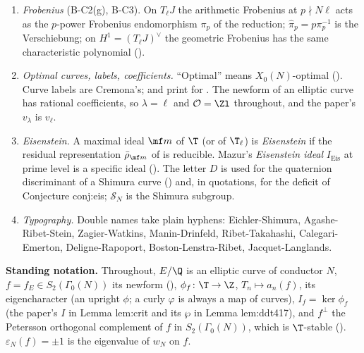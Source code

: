 \begin{convention}
\begin{enumerate}[label=(C\arabic*)]
\item \emph{Frobenius} (B-C2(g), B-C3). On $T_\ell J$ the arithmetic Frobenius at $p\nmid N\ell$ acts as the $p$-power Frobenius endomorphism
$\pi_p$ of the reduction; $\hat\pi_p=p\pi_p^{-1}$ is the Verschiebung; on $H^1=(T_\ell J)^\vee$ the geometric Frobenius has the same characteristic
polynomial ().
\item \emph{Optimal curves, labels, coefficients.} ``Optimal'' means $X_0(N)$-optimal (). Curve labels are Cremona's;
\cite{ARS12} and \cite{Cremona97} print  for . The newform of an elliptic curve has rational coefficients, so $\lambda=\ell$ and
$\mathcal O=\Zl$ throughout, and the paper's $v_\lambda$ is $v_\ell$.
\item \emph{Eisenstein.} A maximal ideal $\mf m$ of $\T$ (or of $\T_\ell$) is \emph{Eisenstein} if the residual representation $\bar\rho_{\mf m}$ of
 is reducible. Mazur's \emph{Eisenstein ideal} $I_{\mathrm{Eis}}$ at prime level is a specific ideal
(). The letter $D$ is used for the quaternion discriminant of a Shimura curve () and,
in quotations, for the deficit of Conjecture conj:eis; $\mathcal S_N$ is the Shimura subgroup.
\item \emph{Typography.} Double names take plain hyphens: Eichler-Shimura, Agashe-Ribet-Stein, Zagier-Watkins, Manin-Drinfeld,
Ribet-Takahashi, Calegari-Emerton, Deligne-Rapoport, Boston-Lenstra-Ribet, Jacquet-Langlands.
\end{enumerate}
\end{convention}

\noindent\textbf{Standing notation.} Throughout, $E/\Q$ is an elliptic curve of conductor $N$, $f=f_E\in S_2(\Gamma_0(N))$ its newform
(), $\phi_f\colon\T\to\Z$, $T_n\mapsto a_n(f)$, its eigencharacter (an upright $\phi$; a curly $\varphi$ is always a map of
curves), $I_f=\ker\phi_f$ (the paper's $I$ in Lemma lem:crit and its $\wp$ in Lemma lem:ddt417), and $f^\perp$ the Petersson orthogonal
complement of $f$ in $S_2(\Gamma_0(N))$, which is $\T$-stable (). $\varepsilon_N(f)=\pm1$ is the eigenvalue of $w_N$ on $f$.

